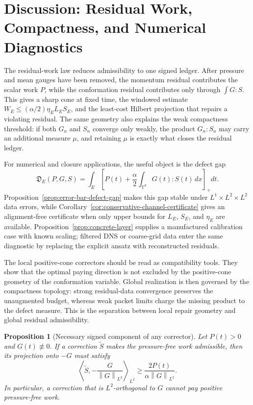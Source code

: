 \documentclass[11pt]{article}
\numberwithin{equation}{section}
\newtheorem{proposition}[theorem]{Proposition}
\newcommand{\norm}[1]{\left\lVert #1\right\rVert}
\begin{document}
\section{Discussion: Residual Work, Compactness, and Numerical Diagnostics}
\label{sec:discussion}

The residual-work law reduces admissibility to one signed ledger.  After
pressure and mean gauges have been removed, the momentum residual contributes
the scalar work \(P\), while the conformation residual contributes only through
\(\int G:S\).  This gives a sharp cone at fixed time, the windowed estimate
\(W_E\le(\alpha/2)\eta_E L_ES_E\), and the least-cost Hilbert projection that
repairs a violating residual.  The same geometry also explains the weak
compactness threshold: if both \(G_n\) and \(S_n\) converge only weakly, the
product \(G_n:S_n\) may carry an additional measure \(\mu\), and retaining
\(\mu\) is exactly what closes the residual ledger.

For numerical and closure applications, the useful object is the defect gap
\[
  \mathfrak D_E(P,G,S)
  =
  \int_E\left[
  P(t)+\frac{\alpha}{2}\int_{\mathbb T^d}G(t):S(t)\,dx
  \right]_+dt .
\]
Proposition~\ref{prop:error-bar-defect-gap} makes this gap stable under
\(L^1\times L^2\times L^2\) data errors, while
Corollary~\ref{cor:conservative-channel-certificate} gives an alignment-free
certificate when only upper bounds for \(L_E\), \(S_E\), and \(\eta_E\) are
available.  Proposition~\ref{prop:concrete-layer} supplies a manufactured
calibration case with known scaling; filtered DNS or coarse-grid data enter the
same diagnostic by replacing the explicit ansatz with reconstructed residuals.

The local positive-cone correctors should be read as compatibility tools.  They
show that the optimal paying direction is not excluded by the positive-cone
geometry of the conformation variable.  Global realization is then governed by
the compactness topology: strong residual-data convergence preserves the
unaugmented budget, whereas weak packet limits charge the missing product to
the defect measure.  This is the separation between local repair geometry and
global residual admissibility.

\begin{proposition}[Necessary signed component of any corrector]
\label{prop:necessary-corrector}
Let \(P(t)>0\) and \(G(t)\not\equiv0\).  If a correction
\(\widetilde S\) makes the pressure-free work admissible, then its projection
onto \(-G\) must satisfy
\[
  \left\langle \widetilde S,
  -\frac{G}{\norm{G}_{L^2}}\right\rangle_{L^2}
  \ge
  \frac{2P(t)}{\alpha\norm{G}_{L^2}} .
\]
In particular, a correction that is \(L^2\)-orthogonal to \(G\) cannot pay
positive pressure-free work.
\end{proposition}
\end{document}
